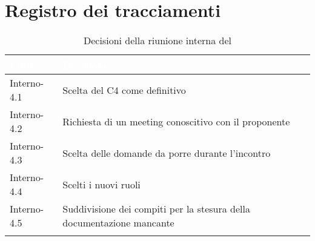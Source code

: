 \section{Registro dei tracciamenti}
{
\renewcommand{\arraystretch}{1.5}
\centering
\begin{longtable}{C{3cm} C{9cm}}
\textcolor{white}{\textbf{Codice}}&
\textcolor{white}{\textbf{Decisione}}\\	
\endhead
		
Interno-4.1 & Scelta del  C4 come definitivo\\

Interno-4.2 & Richiesta di un meeting conoscitivo con il proponente\\

Interno-4.3 & Scelta delle domande da porre durante l'incontro\\

Interno-4.4 & Scelti i nuovi ruoli\\

Interno-4.5 & Suddivisione dei compiti per la stesura della documentazione mancante\\
		
\caption{Decisioni della riunione interna del \Data{}}
\end{longtable}
}
